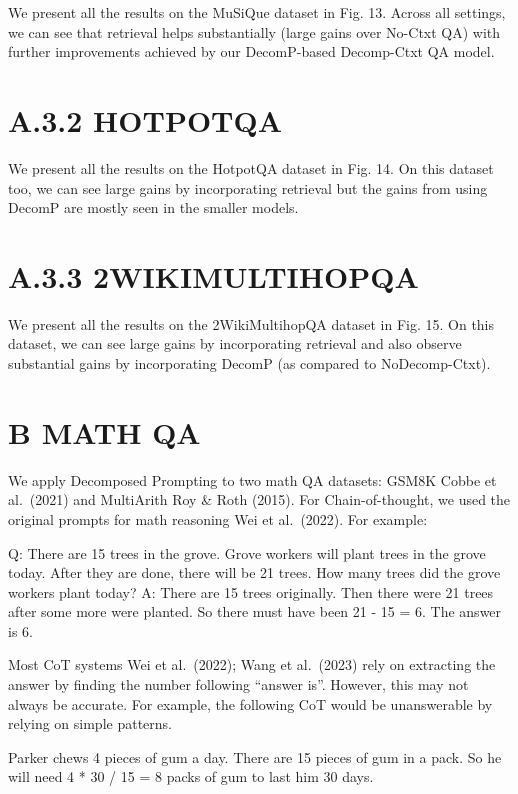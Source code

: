 \documentclass[
]{article}
\begin{document}
We present all the results on the MuSiQue dataset in Fig. 13. Across all
settings, we can see that retrieval helps substantially (large gains
over No-Ctxt QA) with further improvements achieved by our DecomP-based
Decomp-Ctxt QA model.

\section{A.3.2 HOTPOTQA}\label{a.3.2-hotpotqa}

We present all the results on the HotpotQA dataset in Fig. 14. On this
dataset too, we can see large gains by incorporating retrieval but the
gains from using DecomP are mostly seen in the smaller models.

\section{A.3.3 2WIKIMULTIHOPQA}\label{a.3.3-2wikimultihopqa}

We present all the results on the 2WikiMultihopQA dataset in Fig. 15. On
this dataset, we can see large gains by incorporating retrieval and also
observe substantial gains by incorporating DecomP (as compared to
NoDecomp-Ctxt).

\section{B MATH QA}\label{b-math-qa}

We apply Decomposed Prompting to two math QA datasets: GSM8K Cobbe et
al.~(2021) and MultiArith Roy \& Roth (2015). For Chain-of-thought, we
used the original prompts for math reasoning Wei et al.~(2022). For
example:

Q: There are 15 trees in the grove. Grove workers will plant trees in
the grove today. After they are done, there will be 21 trees. How many
trees did the grove workers plant today? A: There are 15 trees
originally. Then there were 21 trees after some more were planted. So
there must have been 21 - 15 = 6. The answer is 6.

Most CoT systems Wei et al.~(2022); Wang et al.~(2023) rely on
extracting the answer by finding the number following ``answer is''.
However, this may not always be accurate. For example, the following CoT
would be unanswerable by relying on simple patterns.

Parker chews 4 pieces of gum a day. There are 15 pieces of gum in a
pack. So he will need 4 * 30 / 15 = 8 packs of gum to last him 30 days.
\end{document}
